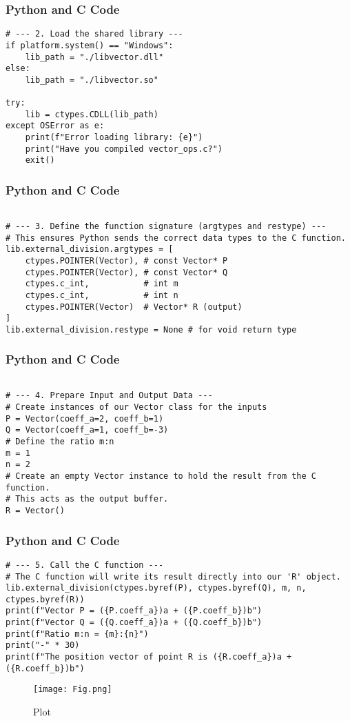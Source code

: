 \documentclass{beamer}
\begin{document}
\begin{frame}[fragile]
\frametitle{Python and C Code}

\begin{lstlisting}
# --- 2. Load the shared library ---
if platform.system() == "Windows":
    lib_path = "./libvector.dll"
else:
    lib_path = "./libvector.so"

try:
    lib = ctypes.CDLL(lib_path)
except OSError as e:
    print(f"Error loading library: {e}")
    print("Have you compiled vector_ops.c?")
    exit()
\end{lstlisting}

\end{frame}

\begin{frame}[fragile]
\frametitle{Python and C Code}

\begin{lstlisting}

# --- 3. Define the function signature (argtypes and restype) ---
# This ensures Python sends the correct data types to the C function.
lib.external_division.argtypes = [
    ctypes.POINTER(Vector), # const Vector* P
    ctypes.POINTER(Vector), # const Vector* Q
    ctypes.c_int,           # int m
    ctypes.c_int,           # int n
    ctypes.POINTER(Vector)  # Vector* R (output)
]
lib.external_division.restype = None # for void return type
\end{lstlisting}

\end{frame}

\begin{frame}[fragile]
\frametitle{Python and C Code}

\begin{lstlisting}

# --- 4. Prepare Input and Output Data ---
# Create instances of our Vector class for the inputs
P = Vector(coeff_a=2, coeff_b=1)
Q = Vector(coeff_a=1, coeff_b=-3)
# Define the ratio m:n
m = 1
n = 2
# Create an empty Vector instance to hold the result from the C function.
# This acts as the output buffer.
R = Vector()

\end{lstlisting}

\end{frame}

\begin{frame}[fragile]
\frametitle{Python and C Code}

\begin{lstlisting}
# --- 5. Call the C function ---
# The C function will write its result directly into our 'R' object.
lib.external_division(ctypes.byref(P), ctypes.byref(Q), m, n, ctypes.byref(R))
print(f"Vector P = ({P.coeff_a})a + ({P.coeff_b})b")
print(f"Vector Q = ({Q.coeff_a})a + ({Q.coeff_b})b")
print(f"Ratio m:n = {m}:{n}")
print("-" * 30)
print(f"The position vector of point R is ({R.coeff_a})a + ({R.coeff_b})b")
\end{lstlisting}

\end{frame}

 


\begin{figure}
    \centering
    \texttt{[image: Fig.png]}
    \caption{Plot}
    \label{fig:placeholder}
\end{figure}
\end{document}
